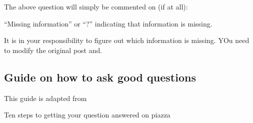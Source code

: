 The above question will simply be commented on (if at all):

``Missing information'' or ``?'' indicating that information is missing.

It is in your responsibility to figure out which information is
missing. YOu need to modify the original post and.

\subsection{Guide on how to ask good questions}

This guide is adapted from


Ten steps to getting your question answered on piazza

